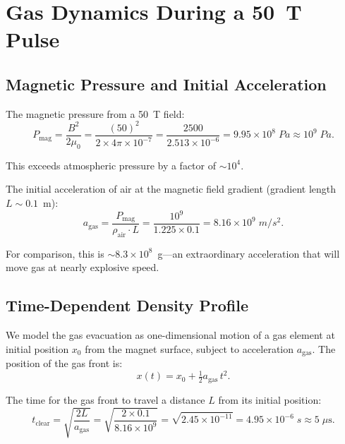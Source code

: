 \documentclass[amsmath,amssymb,aps,prd,superscriptaddress,nofootinbib]{revtex4-2}
\begin{document}
\section{Gas Dynamics During a 50~T Pulse}\label{sec:gas-dynamics}

\subsection{Magnetic Pressure and Initial Acceleration}

The magnetic pressure from a 50~T field:
\begin{equation}\label{eq:Pmag}
P_\text{mag} = \frac{B^2}{2\mu_0}
= \frac{(50)^2}{2 \times 4\pi \times 10^{-7}}
= \frac{2500}{2.513 \times 10^{-6}}
= 9.95 \times 10^{8} \; \si{Pa}
\approx 10^9 \; \si{Pa}.
\end{equation}

This exceeds atmospheric pressure by a factor of $\sim 10^4$.

The initial acceleration of air at the magnetic field gradient
(gradient length $L \sim 0.1$~m):
\begin{equation}\label{eq:a-gas}
a_\text{gas} = \frac{P_\text{mag}}{\rho_\text{air} \cdot L}
= \frac{10^9}{1.225 \times 0.1}
= 8.16 \times 10^{9} \; \si{m/s^2}.
\end{equation}

For comparison, this is $\sim 8.3 \times 10^{8}$~g---an extraordinary
acceleration that will move gas at nearly explosive speed.

\subsection{Time-Dependent Density Profile}

We model the gas evacuation as one-dimensional motion of a gas element
at initial position $x_0$ from the magnet surface, subject to
acceleration $a_\text{gas}$. The position of the gas front is:
\begin{equation}
x(t) = x_0 + \tfrac{1}{2} a_\text{gas} \, t^2.
\end{equation}

The time for the gas front to travel a distance $L$ from its initial
position:
\begin{equation}\label{eq:t-clear}
t_\text{clear} = \sqrt{\frac{2L}{a_\text{gas}}}
= \sqrt{\frac{2 \times 0.1}{8.16 \times 10^9}}
= \sqrt{2.45 \times 10^{-11}}
= 4.95 \times 10^{-6} \; \si{s}
\approx 5 \; \mu\text{s}.
\end{equation}
\end{document}
